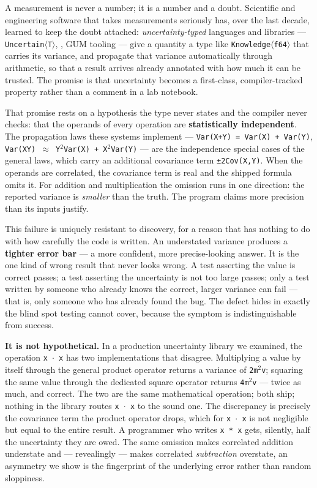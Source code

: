 \documentclass[sigplan,review,anonymous,10pt]{acmart}
\begin{document}
A measurement is never a number; it is a number and a doubt. Scientific and engineering software that takes measurements seriously has, over the last decade, learned to keep the doubt attached: \emph{uncertainty-typed} languages and libraries --- \texttt{Uncertain$\langle$T$\rangle$}, , GUM tooling --- give a quantity a type like \texttt{Knowledge$\langle$f64$\rangle$} that carries its variance, and propagate that variance automatically through arithmetic, so that a result arrives already annotated with how much it can be trusted. The promise is that uncertainty becomes a first-class, compiler-tracked property rather than a comment in a lab notebook.

That promise rests on a hypothesis the type never states and the compiler never checks: that the operands of every operation are \textbf{statistically independent}. The propagation laws these systems implement --- \texttt{Var(X+Y) = Var(X) + Var(Y)}, \texttt{Var(XY) $\approx$ Y$^{2}$Var(X) + X$^{2}$Var(Y)} --- are the independence special cases of the general laws, which carry an additional covariance term \texttt{±2Cov(X,Y)}. When the operands are correlated, the covariance term is real and the shipped formula omits it. For addition and multiplication the omission runs in one direction: the reported variance is \emph{smaller} than the truth. The program claims more precision than its inputs justify.

This failure is uniquely resistant to discovery, for a reason that has nothing to do with how carefully the code is written. An understated variance produces a \textbf{tighter error bar} --- a more confident, more precise-looking answer. It is the one kind of wrong result that never looks wrong. A test asserting the value is correct passes; a test asserting the uncertainty is not too large passes; only a test written by someone who already knows the correct, larger variance can fail --- that is, only someone who has already found the bug. The defect hides in exactly the blind spot testing cannot cover, because the symptom is indistinguishable from success.

\textbf{It is not hypothetical.} In a production uncertainty library we examined, the operation \texttt{x $\cdot$ x} has two implementations that disagree. Multiplying a value by itself through the general product operator returns a variance of \texttt{2m$^{2}$v}; squaring the same value through the dedicated square operator returns \texttt{4m$^{2}$v} --- twice as much, and correct. The two are the same mathematical operation; both ship; nothing in the library routes \texttt{x $\cdot$ x} to the sound one. The discrepancy is precisely the covariance term the product operator drops, which for \texttt{x $\cdot$ x} is not negligible but equal to the entire result. A programmer who writes \texttt{x * x} gets, silently, half the uncertainty they are owed. The same omission makes correlated addition understate and --- revealingly --- makes correlated \emph{subtraction} overstate, an asymmetry we show is the fingerprint of the underlying error rather than random sloppiness.
\end{document}
